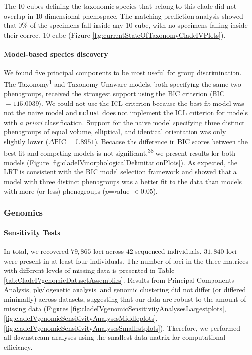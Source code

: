 \documentclass[
  11pt,
]{article}
\begin{document}
The 10-cubes defining the taxonomic species that belong to this clade did not overlap in 10-dimensional phenospace. The matching-prediction analysis showed that \(0\)\% of the specimens fall inside any 10-cube, with no specimens falling inside their correct 10-cube (Figure \ref{fig:currentStateOfTaxonomyCladeIVPlots}).

\hypertarget{model-based-species-discovery-6}{%
\paragraph{Model-based species discovery}\label{model-based-species-discovery-6}}

We found five principal components to be most useful for group discrimination. The Taxonomy\textsuperscript{1} and Taxonomy Unaware models, both specifying the same two phenogroups, received the strongest support using the BIC criterion (BIC\(=115.0039\)). We could not use the ICL criterion because the best fit model was not the naive model and \texttt{mclust} does not implement the ICL criterion for models with \emph{a priori} classification. Support for the naive model specifying three distinct phenogroups of equal volume, elliptical, and identical orientation was only slightly lower (\(\Delta\)BIC\(=0.8951\)). Because the difference in BIC scores between the best fit and competing models is not significant,\textsuperscript{38} we present results for both models (Figure \ref{fig:cladeIVmorphologicalDelimitationPlots}). As expected, the LRT is consistent with the BIC model selection framework and showed that a model with three distinct phenogroups was a better fit to the data than models with more (or less) phenogroups (\(p\)=value \(<0.05\)).

\hypertarget{genomics-4}{%
\subsubsection{Genomics}\label{genomics-4}}

\hypertarget{sensitivity-tests-3}{%
\paragraph{Sensitivity Tests}\label{sensitivity-tests-3}}

In total, we recovered \(79,865\) loci across \(42\) sequenced individuals. \(31,840\) loci were present in at least four individuals. The number of loci in the three matrices with different levels of missing data is presented in Table \ref{tab:CladeIVgenomicDatasetAssemblies}. Results from Principal Components Analysis, phylogenetic analysis, and genomic clustering did not differ (or differed minimally) across datasets, suggesting that our data are robust to the amount of missing data (Figures \ref{fig:cladeIVgenomicSensitivityAnalysesLargestplots}, \ref{fig:cladeIVgenomicSensitivityAnalysesMiddleplots}, \ref{fig:cladeIVgenomicSensitivityAnalysesSmallestplots}). Therefore, we performed all downstream analyses using the smallest data matrix for computational efficiency.
\end{document}
